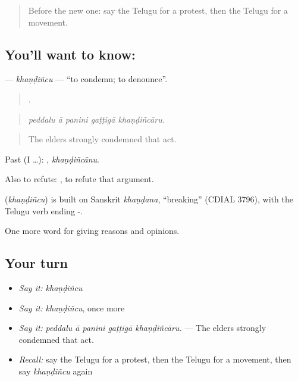\label{lesson:TE-C407-khandincu}



\begin{quote}
Before the new one: say the Telugu for a protest, then the Telugu for a movement.
\end{quote}

\subsection*{You'll want to know: }
\textbf{} — \emph{khaṇḍiñcu} — \textquotedblleft{}to condemn; to denounce\textquotedblright{}.

\begin{quote}
    .
\end{quote}

\begin{quote}
\emph{peddalu ā panini gaṭṭigā khaṇḍiñcāru.}
\end{quote}

\begin{quote}
The elders strongly condemned that act.
\end{quote}

Past (I …): , \emph{khaṇḍiñcānu}.

Also to refute:   , to refute that argument.

\begin{cousinweb}
\textbf{} (\emph{khaṇḍiñcu}) is built on Sanskrit \emph{khaṇḍana}, \textquotedblleft{}breaking\textquotedblright{} (CDIAL 3796), with the Telugu verb ending -.
\end{cousinweb}

\begin{grammarlens}[title={What you've built}]
One more word for giving reasons and opinions.
\end{grammarlens}

\subsection*{Your turn}
\begin{itemize}
\raggedright
  \item \emph{Say it:} \emph{khaṇḍiñcu}
  \item \emph{Say it:} \emph{khaṇḍiñcu}, once more
  \item \emph{Say it:} \emph{peddalu ā panini gaṭṭigā khaṇḍiñcāru.} — The elders strongly condemned that act.
  \item \emph{Recall:} say the Telugu for a protest, then the Telugu for a movement, then say \emph{khaṇḍiñcu} again
\end{itemize}

